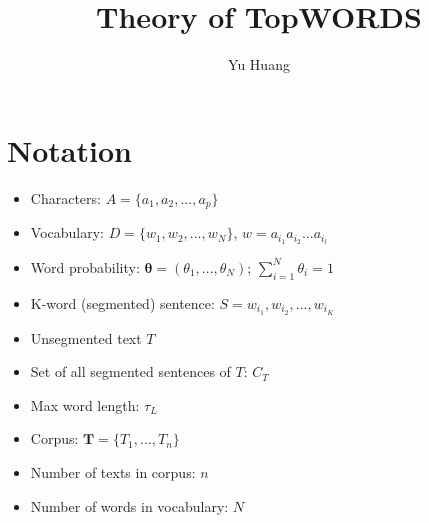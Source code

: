 \documentclass[12pt]{article}
\title{Theory of TopWORDS}
\author{Yu Huang \inst{1} }
\begin{document}
 
\maketitle

\section{Notation}
\begin{itemize}
\item Characters: $A = \{a_1, a_2, ..., a_p\}$
\item Vocabulary: $D = \{w_1, w_2, ..., w_N\}$, $w = a_{i_1}a_{i_2}...a_{i_l}$
\item Word probability: $\bm{\theta} = (\theta_1, ..., \theta_N)$; $\sum_{i=1}^N \theta_i = 1$
\item K-word (segmented) sentence: $S = w_{i_1}, w_{i_2}, ..., w_{i_K}$
\item Unsegmented text $T$
\item Set of all segmented sentences of $T$: $C_T$
\item Max word length: $\tau_L$
\item Corpus: $\bm{T} = \{T_1, ..., T_n\}$
\item Number of texts in corpus: $n$
\item Number of words in vocabulary: $N$
\end{itemize}
\end{document}

